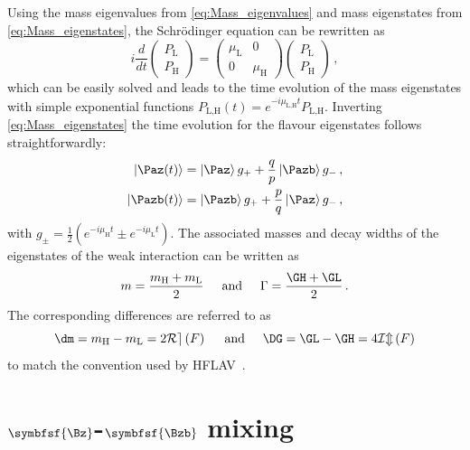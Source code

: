 Using the mass eigenvalues from \cref{eq:Mass_eigenvalues} and mass eigenstates from \cref{eq:Mass_eigenstates}, the Schrödinger equation can be rewritten as
\begin{equation}
i\frac{d}{dt}\begin{pmatrix} P_\text{L} \\ P_\text{H} \end{pmatrix} = \begin{pmatrix} \mu_\text{L} & 0 \\ 0 & \mu_\text{H} \end{pmatrix}\begin{pmatrix} P_\text{L} \\ P_\text{H} \end{pmatrix}\,,
\end{equation}
which can be easily solved and leads to the time evolution of the mass eigenstates with simple exponential functions $P_\text{L,H}(t)=e^{-i\mu_\text{L,H}t}P_\text{L,H}$.
Inverting \cref{eq:Mass_eigenstates} the time evolution for the flavour eigenstates follows straightforwardly:
\begin{equation}
\begin{split}
\left|\Paz\!\left(t\right)\right>&=\left|\Paz\right>g_++\frac{q}{p}\left|\Pazb\right>g_-\,,\\
\left|\Pazb\!\left(t\right)\right>&=\left|\Pazb\right>g_++\frac{p}{q}\left|\Paz\right>g_-\,,\label{eq:timeEvolution}
\end{split}
\end{equation}
with $g_\pm=\frac{1}{2}\left(e^{-i\mu_\text{H}t}\pm e^{-i\mu_\text{L}t}\right)$.
The associated masses and decay widths of the eigenstates of the weak interaction can be written as
\begin{equation}
m=\frac{m_\text{H}+m_\text{L}}{2}\hspace{0.5cm}\text{and}\hspace{0.5cm}\Gamma=\frac{\GH+\GL}{2}\,.
\end{equation}
The corresponding differences are referred to as
\begin{equation}
\dm=m_\text{H}-m_\text{L}=2\mathcal{Re}\left(F\right)\hspace{0.5cm}\text{and}\hspace{0.5cm}\DG=\GL-\GH=4\mathcal{Im}\left(F\right)\label{eq:define_dmAndDG}
\end{equation}
to match the convention used by \ac{HFLAV}~\cite{HFLAV2016}.

\section[head={\Bz-\Bzb mixing},tocentry={\Bz-\Bzb mixing}]{$\symbfsf{\Bz}$-$\symbfsf{\Bzb}$ mixing}
\label{sec:BBbarMixing}

